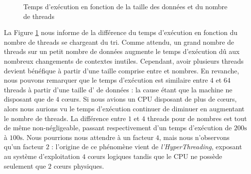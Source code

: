 \documentclass[12pt]{article}
\begin{document}
\begin{figure}
    \begin{center}
        \caption{Temps d'exécution en fonction de la taille des données et du nombre de threads}
        \label{time-to-data-size-and-threads}
    \end{center}
\end{figure}

La Figure \ref{time-to-data-size-and-threads} nous informe de la différence du
temps d'exécution en fonction du nombre de threads se chargeant du tri. Comme
attendu, un grand nombre de threads sur un petit nombre de données augmente le
temps d'exécution dû aux nombreux changements de contextes inutiles. Cependant,
avoir plusieurs threads devient bénéfique à partir d'une taille comprise entre
 et  nombres. En revanche, nous pouvons remarquer
que le temps d'exécution est similaire entre $4$ et $64$ threads à partir d'une
taille d' de données : la cause étant que la machine ne
disposant que de $4$ c\oe{}urs. Si nous avions un CPU disposant de plus de
c\oe{}urs, alors nous aurions vu le temps d'exécution continuer de diminuer en
augmentant le nombre de threads. La différence entre $1$ et $4$ threads pour
 de nombres est tout de même non-négligeable, passant
respectivement d'un temps d'exécution de $200\si{\second}$ à $100\si{\second}$.
Nous pourrions nous attendre à un facteur $4$, mais nous n'observons qu'un
facteur $2$ : l'origine de ce phénomène vient de \emph{l'HyperThreading},
exposant au système d'exploitation $4$ c\oe{}urs logiques tandis que le CPU ne
possède seulement que $2$ c\oe{}urs physiques.
\end{document}
